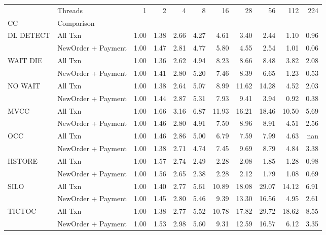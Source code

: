 \begin{tabular}{llrrrrrrrrr}
\toprule
       & Threads &  1   &  2   &  4   &  8   &   16  &   28  &   56  &   112 &  224 \\
CC & Comparison &      &      &      &      &       &       &       &       &      \\
\midrule
DL DETECT & All Txn & 1.00 & 1.38 & 2.66 & 4.27 &  4.61 &  3.40 &  2.44 &  1.10 & 0.96 \\
       & NewOrder + Payment & 1.00 & 1.47 & 2.81 & 4.77 &  5.80 &  4.55 &  2.54 &  1.01 & 0.06 \\
WAIT DIE & All Txn & 1.00 & 1.36 & 2.62 & 4.94 &  8.23 &  8.66 &  8.48 &  3.82 & 2.08 \\
       & NewOrder + Payment & 1.00 & 1.41 & 2.80 & 5.20 &  7.46 &  8.39 &  6.65 &  1.23 & 0.53 \\
NO WAIT & All Txn & 1.00 & 1.38 & 2.64 & 5.07 &  8.99 & 11.62 & 14.28 &  4.52 & 2.03 \\
       & NewOrder + Payment & 1.00 & 1.44 & 2.87 & 5.31 &  7.93 &  9.41 &  3.94 &  0.92 & 0.38 \\
MVCC & All Txn & 1.00 & 1.66 & 3.16 & 6.87 & 11.93 & 16.21 & 18.46 & 10.50 & 5.69 \\
       & NewOrder + Payment & 1.00 & 1.46 & 2.80 & 4.91 &  7.50 &  8.96 &  8.91 &  4.51 & 2.56 \\
OCC & All Txn & 1.00 & 1.46 & 2.86 & 5.00 &  6.79 &  7.59 &  7.99 &  4.63 &  nan \\
       & NewOrder + Payment & 1.00 & 1.38 & 2.71 & 4.74 &  7.45 &  9.69 &  8.79 &  4.84 & 3.38 \\
HSTORE & All Txn & 1.00 & 1.57 & 2.74 & 2.49 &  2.28 &  2.08 &  1.85 &  1.28 & 0.98 \\
       & NewOrder + Payment & 1.00 & 1.56 & 2.65 & 2.38 &  2.28 &  2.12 &  1.79 &  1.08 & 0.69 \\
SILO & All Txn & 1.00 & 1.40 & 2.77 & 5.61 & 10.89 & 18.08 & 29.07 & 14.12 & 6.91 \\
       & NewOrder + Payment & 1.00 & 1.45 & 2.80 & 5.46 &  9.39 & 13.30 & 16.56 &  4.95 & 2.61 \\
TICTOC & All Txn & 1.00 & 1.38 & 2.77 & 5.52 & 10.78 & 17.82 & 29.72 & 18.62 & 8.55 \\
       & NewOrder + Payment & 1.00 & 1.53 & 2.98 & 5.60 &  9.31 & 12.59 & 16.57 &  6.12 & 3.35 \\
\bottomrule
\end{tabular}
